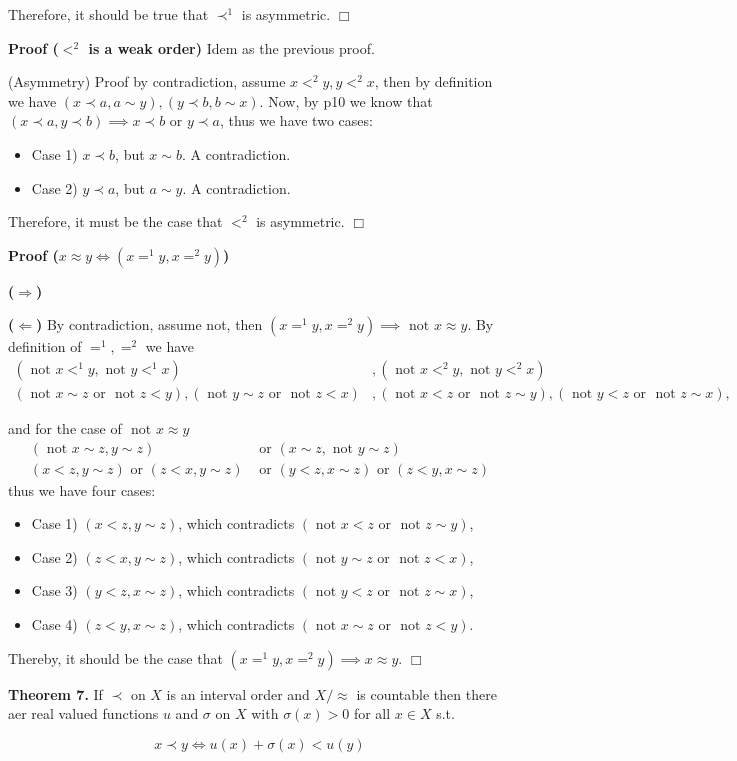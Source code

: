 \documentclass{article}
\theoremstyle{definition}
\def\tor{\text{ or }}
\def\tnot{\text{ not }}
\begin{document}
Therefore, it should be true that $\prec^1$ is asymmetric. $\Box$

{\bf Proof ($<^2$ is a weak order)} Idem as the previous proof.

(Asymmetry) Proof by contradiction, assume $x<^2y,y<^2x$, then by definition we have $(x\prec a,a\sim y),(y\prec b,b\sim x)$. Now, by p10 we know that $(x\prec a,y\prec b)\implies x\prec b\tor y\prec a$, thus we have two cases:

\begin{itemize}
\item[] Case 1) $x\prec b$, but $x\sim b$. A contradiction.
\item[] Case 2) $y\prec a$, but $a\sim y$. A contradiction.
\end{itemize}

Therefore, it must be the case that $<^2$ is asymmetric. $\Box$

{\bf Proof ($x\approx y\iff (x=^1y,x=^2y)$)}

{\bf ($\Rightarrow$)} 

{\bf ($\Leftarrow$)} By contradiction, assume not, then $(x=^1y,x=^2y)\implies\tnot x\approx y$. By definition of $=^1,=^2$ we have
\begin{align*}
(\tnot x<^1y,\tnot y<^1x)&, (\tnot x<^2y,\tnot y<^2x)\\
(\tnot x\sim z\tor\tnot z<y),(\tnot y\sim z\tor\tnot z<x)&,(\tnot x< z\tor\tnot z\sim y),(\tnot y< z\tor\tnot z\sim x),
\end{align*}

and for the case of $\tnot x\approx y$
\begin{align*}
(\tnot x\sim z,y\sim z)&\tor(x\sim z,\tnot y\sim z)\\
(x<z,y\sim z)\tor(z<x,y\sim z)&\tor(y<z,x\sim z)\tor(z<y,x\sim z)
\end{align*}
thus we have four cases:

\begin{itemize}
\item[] Case 1) $(x<z,y\sim z)$, which contradicts $(\tnot x< z\tor\tnot z\sim y)$,
\item[] Case 2) $(z<x,y\sim z)$, which contradicts $(\tnot y\sim z\tor\tnot z<x)$,
\item[] Case 3) $(y<z,x\sim z)$, which contradicts $(\tnot y< z\tor\tnot z\sim x)$,
\item[] Case 4) $(z<y,x\sim z)$, which contradicts $(\tnot x\sim z\tor\tnot z<y)$.
\end{itemize}

Thereby, it should be the case that $(x=^1y,x=^2y)\implies x\approx y$. $\Box$

{\bf Theorem 7.} If $\prec$ on $X$ is an interval order and $X/\approx$ is countable then there aer real valued functions $u$ and $\sigma$ on $X$ with $\sigma(x)>0$ for all $x\in X$ s.t.

\begin{equation*}
x\prec y\iff u(x)+\sigma(x)<u(y)
\end{equation*}
\end{document}
